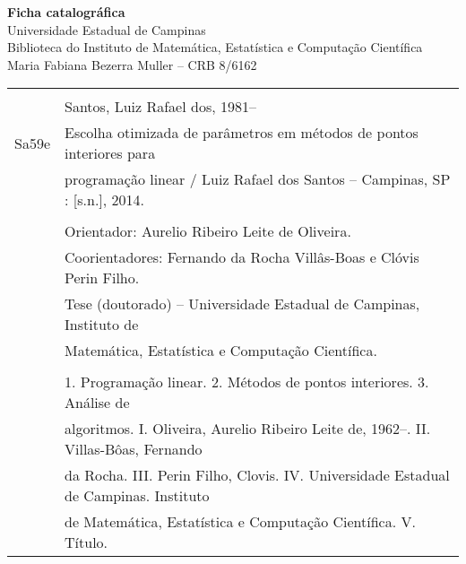 \thispagestyle{plain}


\begin{center}
   \textbf{Ficha catalográfica} \\
   Universidade Estadual de Campinas \\
   Biblioteca do Instituto de Matemática, Estatística e Computação Científica\\
Maria Fabiana Bezerra Muller -- CRB 8/6162
\end{center}
\vfill
\begin{center}

\begin{tabular}{|cl|} \hline
  \hspace{1.3cm} & \\
  & Santos, Luiz Rafael dos, 1981--  \\
  \hspace{0.2cm} Sa59e & \hspace{0.6cm} Escolha otimizada de parâmetros em métodos de pontos interiores  para \\ 
  &    programação linear / Luiz Rafael dos Santos --
  Campinas, SP  : [s.n.], 2014. \\
  & \\
  & \hspace{0.6cm} Orientador: Aurelio Ribeiro Leite de Oliveira.\\
    & \hspace{0.6cm} Coorientadores: Fernando da Rocha Villâs-Boas e Clóvis Perin Filho.\\
  & \hspace{0.6cm} Tese (doutorado) -- 
Universidade Estadual de Campinas, Instituto de  \\
  & Matem\'atica, Estat\'istica e Computa\c{c}\~ao   Cient\'ifica.\\ 
  & \\
  & \hspace{0.6cm} 1. Programação linear. 2. Métodos de pontos interiores.  
  3. Análise de  \\ 
  & algoritmos. I. Oliveira, Aurelio Ribeiro Leite de, 1962--.   II. Villas-Bôas, Fernando  
  \\
  & da Rocha. III. Perin Filho, Clovis.  IV. Universidade Estadual de
Campinas. Instituto   \\
  &  de Matem\'atica,  Estat\'istica e Computa\c{c}\~ao Cient\'ifica.   V. T\'itulo. \\[0.5cm]
  \hline
\end{tabular}
\end{center}

